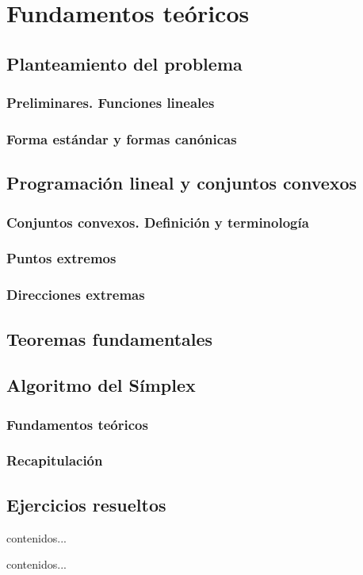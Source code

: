 \chapter{Fundamentos teóricos}
\label{fund}
\section{Planteamiento del problema}
\subsection{Preliminares. Funciones lineales}
\subsection{Forma estándar y formas canónicas}
\section{Programación lineal y conjuntos convexos}
\subsection{Conjuntos convexos. Definición y terminología}
\subsection{Puntos extremos}
\subsection{Direcciones extremas}
\section{Teoremas fundamentales}
\section{Algoritmo del Símplex}
\subsection{Fundamentos teóricos}
\subsection{Recapitulación}
\section{Ejercicios resueltos}
\begin{exerc}
	contenidos...
\end{exerc}
\begin{solu}
	contenidos...
\end{solu}